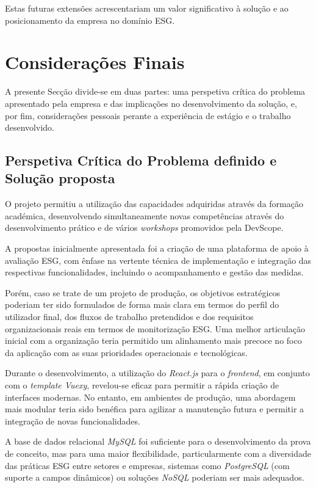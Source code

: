 Estas futuras extensões acrescentariam um valor significativo à solução e ao posicionamento da empresa no domínio ESG.

\section{Considerações Finais}

A presente Secção divide-se em duas partes: uma perspetiva crítica do problema apresentado pela empresa e das implicações no desenvolvimento da solução, e, por fim, considerações pessoais perante a experiência de estágio e o trabalho desenvolvido.

\subsection{Perspetiva Crítica do Problema definido e Solução proposta}

O projeto permitiu a utilização das capacidades adquiridas através da formação académica, desenvolvendo simultaneamente novas competências através do desenvolvimento prático e de vários \textit{workshops} promovidos pela DevScope.

A propostas inicialmente apresentada foi a criação de uma plataforma de apoio à avaliação ESG, com ênfase na vertente técnica de implementação e integração das respectivas funcionalidades, incluindo o acompanhamento e gestão das medidas. 

Porém, caso se trate de um projeto de produção, os objetivos estratégicos poderiam ter sido formulados de forma mais clara em termos do perfil do utilizador final, dos fluxos de trabalho pretendidos e dos requisitos organizacionais reais em termos de monitorização ESG. Uma melhor articulação inicial com a organização teria permitido um alinhamento mais precoce no foco da aplicação com as suas prioridades operacionais e tecnológicas. 

Durante o desenvolvimento, a utilização do \textit{React.js} para o \textit{frontend}, em conjunto com o \textit{template Vuexy}, revelou-se eficaz para permitir a rápida criação de interfaces modernas. No entanto, em ambientes de produção, uma abordagem mais modular teria sido benéfica para agilizar a manutenção futura e permitir a integração de novas funcionalidades.

A base de dados relacional \textit{MySQL} foi suficiente para o desenvolvimento da prova de conceito, mas para uma maior flexibilidade, particularmente com a diversidade das práticas ESG entre setores e empresas, sistemas como \textit{PostgreSQL} (com suporte a campos dinâmicos) ou soluções \textit{NoSQL} poderiam ser mais adequados.

